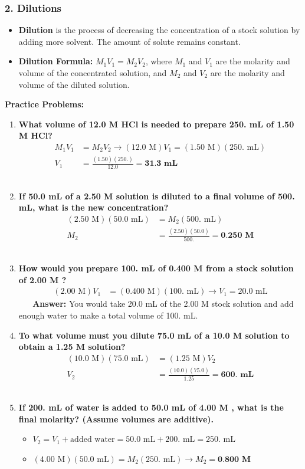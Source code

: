 \documentclass{article}
\begin{document}
\bigskip
\subsubsection*{2. Dilutions}
\begin{itemize}[itemsep=5pt]
    \item \textbf{Dilution} is the process of decreasing the concentration of a stock solution by adding more solvent. The amount of solute remains constant.
    \item \textbf{Dilution Formula:} $M_1V_1 = M_2V_2$, where $M_1$ and $V_1$ are the molarity and volume of the concentrated solution, and $M_2$ and $V_2$ are the molarity and volume of the diluted solution.
\end{itemize}

\textbf{Practice Problems:}
\begin{enumerate}[itemsep=5pt]
    \item \textbf{What volume of 12.0 M HCl is needed to prepare 250. mL of 1.50 M HCl?}
    \begin{align*} M_1V_1 &= M_2V_2 \rightarrow (12.0 \text{ M})V_1 = (1.50 \text{ M})(250. \text{ mL}) \\ V_1 &= \frac{(1.50)(250.)}{12.0} = \textbf{31.3 mL} \end{align*}
    \item \textbf{If 50.0 mL of a 2.50 M  solution is diluted to a final volume of 500. mL, what is the new concentration?}
    \begin{align*} (2.50 \text{ M})(50.0 \text{ mL}) &= M_2(500. \text{ mL}) \\ M_2 &= \frac{(2.50)(50.0)}{500.} = \textbf{0.250 M} \end{align*}
    \item \textbf{How would you prepare 100. mL of 0.400 M  from a stock solution of 2.00 M ?}
    \begin{align*} (2.00 \text{ M})V_1 &= (0.400 \text{ M})(100. \text{ mL}) \rightarrow V_1 = 20.0 \text{ mL} \end{align*}
    \textbf{Answer:} You would take 20.0 mL of the 2.00 M stock solution and add enough water to make a total volume of 100. mL.
    \item \textbf{To what volume must you dilute 75.0 mL of a 10.0 M  solution to obtain a 1.25 M solution?}
    \begin{align*} (10.0 \text{ M})(75.0 \text{ mL}) &= (1.25 \text{ M})V_2 \\ V_2 &= \frac{(10.0)(75.0)}{1.25} = \textbf{600. mL} \end{align*}
    \item \textbf{If 200. mL of water is added to 50.0 mL of 4.00 M , what is the final molarity? (Assume volumes are additive).}
    \begin{itemize}
        \item $V_2 = V_1 + \text{added water} = 50.0 \text{ mL} + 200. \text{ mL} = 250. \text{ mL}$
        \item $(4.00 \text{ M})(50.0 \text{ mL}) = M_2(250. \text{ mL}) \rightarrow M_2 = \textbf{0.800 M}$
    \end{itemize}
\end{enumerate}
\end{document}
